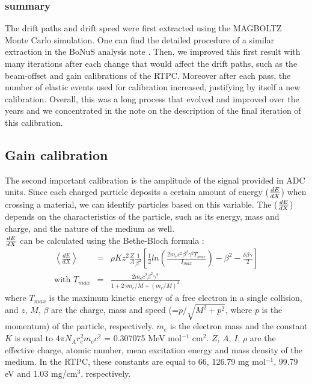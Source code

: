\subsubsection{summary}
The drift paths and drift speed were first extracted using the
MAGBOLTZ Monte Carlo simulation. One can find the detailed procedure of
a similar extraction in the BoNuS analysis note \cite{GEM_holes}.
Then, we improved this first result with many iterations after
each change that would affect the drift paths, such as the beam-offset
 and gain calibrations of the RTPC. Moreover after each pass, the number of
 elastic events used for calibration increased, justifying by itself a new calibration. Overall, this was a long
 process that evolved and improved over the years and we concentrated in the
 note on the description of the final iteration of this calibration.


\subsection{Gain calibration}
The second important calibration is the amplitude of the signal provided in ADC units. Since each charged particle deposits a certain amount of energy ($\small{\frac{dE}{dX}}$) when crossing a material, we can identify particles based on this variable. The ($\small{\frac{dE}{dX}}$) depends on the characteristics of the particle, such as its energy, mass and charge, and the nature of the medium as well. \\

$\small{\frac{dE}{dX}}$ can be calculated using the Bethe-Bloch formula \cite{bethe_block}:
\begin{eqnarray}
 \left\langle \frac{dE}{dX} \right\rangle &=& \rho K z^{2} \frac{Z}{A} \frac{1}{\beta^{2}} \left[ \frac{1}{2} ln \left(\frac{2m_{e}c^{2}\beta^{2}\gamma^{2}T_{max}}{I_{max}} \right) - \beta^{2} -\frac{\delta\beta\gamma}{2}\right]\\
\text{with }
T_{max} &=& \frac{2m_{e}c^{2}\beta^{2}\gamma^{2}}{1+2\gamma m_{e}/M + (m_{e}/M)^{2}} 
\end{eqnarray}
where $T_{max}$ is the maximum kinetic energy of a free electron in a single collision, and $z$, $M$, $\beta$ are the charge, mass and speed (=$p/ \sqrt{M^2 + p^2}$, where $p$ is the momentum) of the particle, respectively. $m_{e}$ is the electron mass and the constant $K$ is equal to $4 \pi N_{A} r^{2}_{e}m_{e}c^{2}$ = 0.307075 MeV mol$^{-1}$ cm$^{2}$. $Z$, $A$, $I$, $\rho$ are the effective charge, atomic number, mean excitation energy and mass density of the medium. In the RTPC, these constants are equal to 66, 126.79 mg mol$^{-1}$, 99.79 eV and 1.03 mg/cm$^3$, respectively. \\

